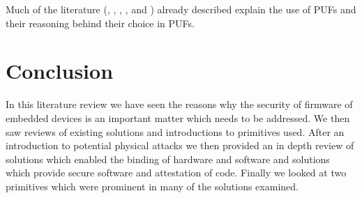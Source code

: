 Much of the literature (\cite{Lee2016}, \cite{Schaller2014}, \cite{Kleber2015}, \cite{Kohnhauser2015}, \cite{Gora2010} and \cite{Simpson2006}) already described explain the use of PUFs and their reasoning behind their choice in PUFs.

\section{Conclusion}

In this literature review we have seen the reasons why the security of firmware of embedded devices is an important matter which needs to be addressed. We then saw reviews of existing solutions and introductions to primitives used. After an introduction to potential physical attacks we then provided an in depth review of solutions which enabled the binding of hardware and software and solutions which provide secure software and attestation of code. Finally we looked at two primitives which were prominent in many of the solutions examined.

